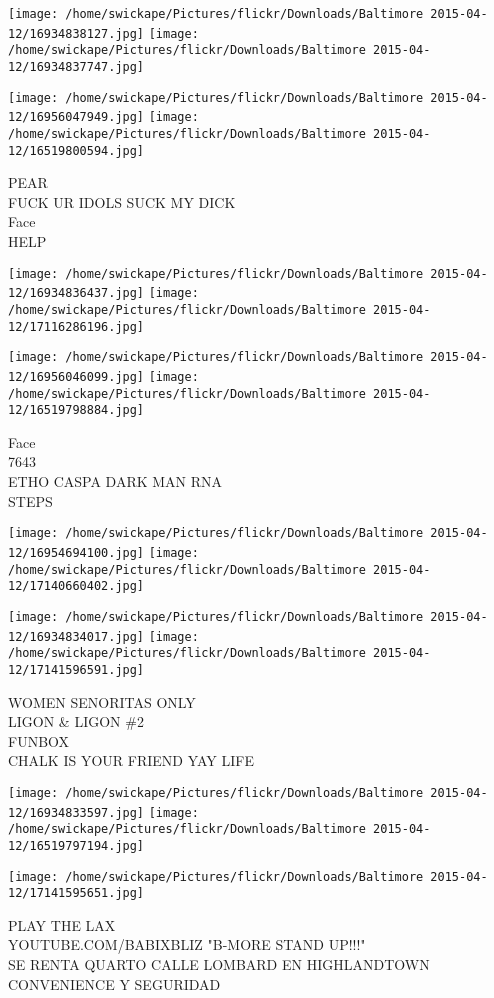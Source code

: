 \documentclass[10pt,letterpaper]{article}
\begin{document}
\texttt{[image: /home/swickape/Pictures/flickr/Downloads/Baltimore 2015-04-12/16934838127.jpg]}
\texttt{[image: /home/swickape/Pictures/flickr/Downloads/Baltimore 2015-04-12/16934837747.jpg]}

\texttt{[image: /home/swickape/Pictures/flickr/Downloads/Baltimore 2015-04-12/16956047949.jpg]}
\texttt{[image: /home/swickape/Pictures/flickr/Downloads/Baltimore 2015-04-12/16519800594.jpg]}

PEAR\\
FUCK UR IDOLS SUCK MY DICK\\
Face\\
HELP
\pagebreak

\texttt{[image: /home/swickape/Pictures/flickr/Downloads/Baltimore 2015-04-12/16934836437.jpg]}
\texttt{[image: /home/swickape/Pictures/flickr/Downloads/Baltimore 2015-04-12/17116286196.jpg]}

\texttt{[image: /home/swickape/Pictures/flickr/Downloads/Baltimore 2015-04-12/16956046099.jpg]}
\texttt{[image: /home/swickape/Pictures/flickr/Downloads/Baltimore 2015-04-12/16519798884.jpg]}

Face\\
7643\\
ETHO CASPA DARK MAN RNA\\
STEPS
\pagebreak

\texttt{[image: /home/swickape/Pictures/flickr/Downloads/Baltimore 2015-04-12/16954694100.jpg]}
\texttt{[image: /home/swickape/Pictures/flickr/Downloads/Baltimore 2015-04-12/17140660402.jpg]}

\texttt{[image: /home/swickape/Pictures/flickr/Downloads/Baltimore 2015-04-12/16934834017.jpg]}
\texttt{[image: /home/swickape/Pictures/flickr/Downloads/Baltimore 2015-04-12/17141596591.jpg]}

WOMEN SENORITAS ONLY\\
LIGON \& LIGON \#2\\
FUNBOX\\
CHALK IS YOUR FRIEND YAY LIFE
\pagebreak

\texttt{[image: /home/swickape/Pictures/flickr/Downloads/Baltimore 2015-04-12/16934833597.jpg]}
\texttt{[image: /home/swickape/Pictures/flickr/Downloads/Baltimore 2015-04-12/16519797194.jpg]}

\texttt{[image: /home/swickape/Pictures/flickr/Downloads/Baltimore 2015-04-12/17141595651.jpg]}

PLAY THE LAX\\
YOUTUBE.COM/BABIXBLIZ "B{-}MORE STAND UP!!!"\\
SE RENTA QUARTO CALLE LOMBARD EN HIGHLANDTOWN CONVENIENCE Y SEGURIDAD
\pagebreak
\end{document}
